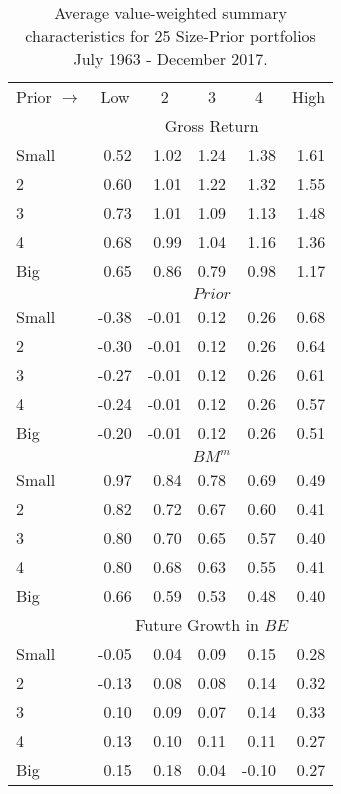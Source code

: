 
\begin{table}[!ht]

\centering
\caption{
\scriptsize{
Average value-weighted summary characteristics for 25 Size-Prior portfolios
July 1963 - December 2017.
}
}
\begin{tabular}{lrrrrr}
  \toprule
  Prior   $\rightarrow$     & \multicolumn{1}{c}{Low}  & \multicolumn{1}{c}{2} & \multicolumn{1}{c}{3} & \multicolumn{1}{c}{4} & \multicolumn{1}{c}{High} \\
                            & \multicolumn{5}{c}{Gross Return} \\
  Small                     &  0.52 &  1.02 &  1.24 &  1.38 &  1.61 \\
      2                     &  0.60 &  1.01 &  1.22 &  1.32 &  1.55 \\
      3                     &  0.73 &  1.01 &  1.09 &  1.13 &  1.48 \\
      4                     &  0.68 &  0.99 &  1.04 &  1.16 &  1.36 \\
    Big                     &  0.65 &  0.86 &  0.79 &  0.98 &  1.17 \\
[1em]

                            & \multicolumn{5}{c}{$Prior$} \\
  Small                     & -0.38 & -0.01 &  0.12 &  0.26 &  0.68 \\
      2                     & -0.30 & -0.01 &  0.12 &  0.26 &  0.64 \\
      3                     & -0.27 & -0.01 &  0.12 &  0.26 &  0.61 \\
      4                     & -0.24 & -0.01 &  0.12 &  0.26 &  0.57 \\
    Big                     & -0.20 & -0.01 &  0.12 &  0.26 &  0.51 \\
[1em]
                            & \multicolumn{5}{c}{$BM^m$} \\
  Small                     &  0.97 &  0.84 &  0.78 &  0.69 &  0.49 \\
      2                     &  0.82 &  0.72 &  0.67 &  0.60 &  0.41 \\
      3                     &  0.80 &  0.70 &  0.65 &  0.57 &  0.40 \\
      4                     &  0.80 &  0.68 &  0.63 &  0.55 &  0.41 \\
    Big                     &  0.66 &  0.59 &  0.53 &  0.48 &  0.40 \\
[1em]

                            & \multicolumn{5}{c}{Future Growth in $BE$} \\
  Small                     & -0.05 &  0.04 &  0.09 &  0.15 &  0.28 \\
      2                     & -0.13 &  0.08 &  0.08 &  0.14 &  0.32 \\
      3                     &  0.10 &  0.09 &  0.07 &  0.14 &  0.33 \\
      4                     &  0.13 &  0.10 &  0.11 &  0.11 &  0.27 \\
    Big                     &  0.15 &  0.18 &  0.04 & -0.10 &  0.27 \\
[1em]
  \bottomrule
\end{tabular}
\label{tbl:Prior}
\end{table}
